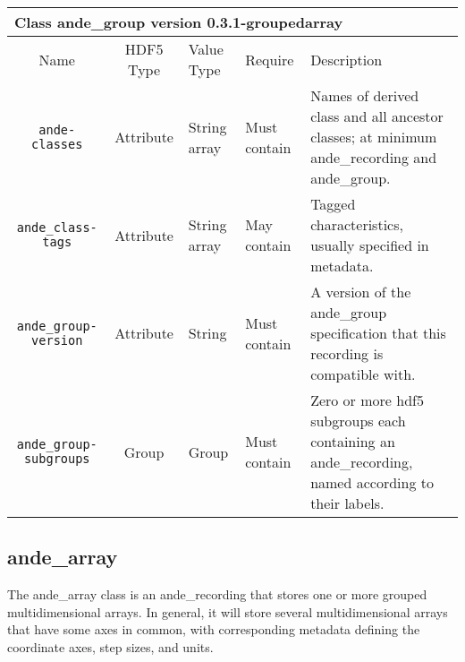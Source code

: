 \documentclass{article}
\newenvironment{AndeClass}[3]{
  
  \begin{tabular}{|c c p{.4in} p{.5in} p{2.9in}|}
    \multicolumn{5}{l}{{\Large \bf Class}{\Large \ttfamily \fontseries{b} #1} version #2 \ifthenelse{\equal{#3}{}}{}{; derives from #3}} \\
    \hline
    Name & HDF5 Type & Value Type & Require & Description \\
    \hline
}{
  \hline
  \end{tabular}
}
\newcommand{\AndeElementLine}[5]{{\tt #1} & #2 & #3 & #4 & #5 \\}
\newcommand{\AndeClassesLine}[1]{
  \AndeElementLine{ande-classes}{Attribute}{String array}{Must contain}{
    Names of derived class and all ancestor classes; at minimum #1.
  }
}
\newcommand{\AndeClassTagsLine}[1]{
  \AndeElementLine{ande\_class-tags}{Attribute}{String array}{May contain}{
    Tagged characteristics, usually specified in metadata\ifthenelse{\equal{#1}{}}{}{; at minimum #1}.
  }
}
\begin{document}
\newcommand{\AndeGroupElements}{
    \AndeElementLine{ande\_group-version}{Attribute}{String}{Must contain}{
      A version of the ande\_group specification that this recording is compatible with.
    }
    \AndeElementLine{ande\_group-subgroups}{Group}{Group}{Must contain}{
      Zero or more hdf5 subgroups each containing an ande\_recording, named according to their labels.
    }
  }

\begin{AndeClass}{ande\_group}{0.3.1-groupedarray}{ande\_recording}
  \AndeClassesLine{ande\_recording and ande\_group}
  \AndeClassTagsLine{}
  \AndeRecordingElements
  \AndeGroupElements %
\end{AndeClass}

\subsection{ande\_array}
The ande\_array class is an ande\_recording that stores one or more grouped multidimensional arrays. In general, it will store several multidimensional arrays that have some axes in common,  with corresponding metadata defining the coordinate axes, step sizes, and units. 
\end{document}
